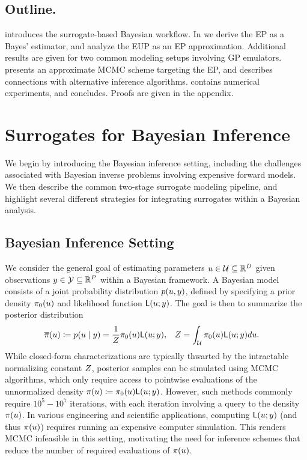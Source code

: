 \documentclass[12pt]{article}
\begin{document}
\subsection{Outline.}
 introduces the surrogate-based Bayesian workflow.
In  we derive the EP as a Bayes' estimator, and 
analyze the EUP as an EP approximation. Additional results are given for
two common modeling setups involving GP emulators.
 presents an approximate MCMC scheme targeting 
the EP, and describes connections with alternative inference algorithms. 
 contains numerical experiments, and 
 concludes. Proofs are given in the appendix.

\section{Surrogates for Bayesian Inference} \label{sec:surrogates-intro}
We begin by introducing the Bayesian inference setting, including the challenges
associated with Bayesian inverse problems involving expensive forward models. 
We then describe the common two-stage surrogate modeling pipeline, and highlight 
several different strategies for integrating surrogates within a Bayesian analysis.

\subsection{Bayesian Inference Setting}
We consider the general goal of estimating parameters $u \in \mathcal{U} \subseteq \mathbb{R}^{D}$ given 
observations $y \in \mathcal{Y} \subseteq \mathbb{R}^{P}$ within a Bayesian framework.
A Bayesian model consists of a joint probability distribution $p(u, y)$, defined by 
specifying a prior density $\pi_0(u)$ and likelihood function $\mathsf{L}(u; y)$.
The goal is then to summarize the posterior distribution 
\begin{align}
&\overline{\pi}(u) \coloneqq p(u \mid y) = \frac{1}{Z} \pi_0(u) \mathsf{L}(u; y), 
&&Z = \int_{\mathcal{U}} \pi_0(u) \mathsf{L}(u; y) du. \label{eq:post_dens_generic}
\end{align}
While closed-form characterizations are typically thwarted by the intractable normalizing constant
$Z$, posterior samples can be simulated using MCMC algorithms, which only require 
access to pointwise evaluations of the unnormalized density 
$\pi(u) \coloneqq \pi_0(u) \mathsf{L}(u; y)$.
However, such methods commonly require $10^5 - 10^7$ iterations, with each iteration 
involving a query to the density $\pi(u)$.
In various engineering and scientific applications, computing $\mathsf{L}(u; y)$ (and thus
$\pi(u)$) requires running an expensive computer simulation. 
This renders MCMC infeasible in this setting, motivating the need for inference schemes 
that reduce the number of required evaluations of $\pi(u)$.
 
\end{document}
